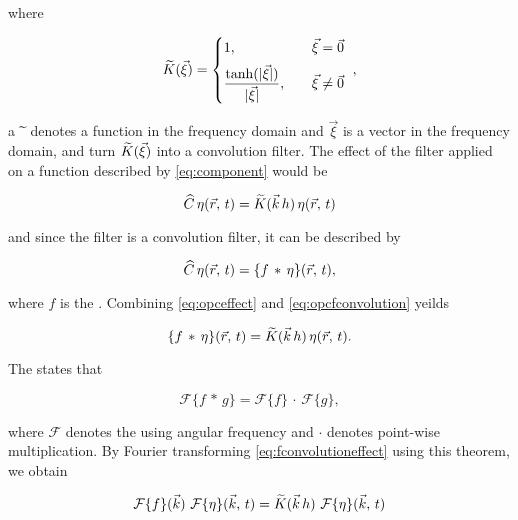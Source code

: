 where

\begin{equation} \label{eq:transkernelofxivec}
\widetilde{K}(\vec{\xi}) = \begin{cases}
1                                                  , & \quad \vec{\xi} = \vec{0} \\[.5em]
\displaystyle\frac{\tanh(|\vec{\xi}|)}{|\vec{\xi}|}, & \quad \vec{\xi} \neq \vec{0}
\end{cases}\ ,
\end{equation}

a $\widetilde{~}$ denotes a function in the frequency domain and $\vec{\xi}$ is a  vector in the frequency domain, and turn $\widetilde{K}(\vec{\xi})$ into a convolution filter. The effect of the filter applied on a function described by \eqref{eq:component} would be

\begin{equation} \label{eq:opceffect}
\widehat{C}\,\eta(\vec{r},\,t) = \widetilde{K}(\vec{k}\,h)\,\eta(\vec{r},\,t)
\end{equation}

and since the filter is a convolution filter, it can be described by

\begin{equation} \label{eq:opcfconvolution}
\widehat{C}\,\eta(\vec{r},\,t) = \{f\,*\,\eta\}(\vec{r},\,t),
\end{equation}

where $f$ is the . Combining \eqref{eq:opceffect} and \eqref{eq:opcfconvolution} yeilds

\begin{equation} \label{eq:fconvolutioneffect}
\{f\,*\,\eta\}(\vec{r},\,t) = \widetilde{K}(\vec{k}\,h)\,\eta(\vec{r},\,t).
\end{equation}

The  states that

\begin{equation} \label{eq:convolutiontheorem}
\mathcal{F}\{f\,*\,g\} = \mathcal{F}\{f\}\,\cdot\,\mathcal{F}\{g\},
\end{equation}

where $\mathcal{F}$ denotes the  using angular frequency and $\cdot$ denotes point-wise multiplication. By Fourier transforming \eqref{eq:fconvolutioneffect} using this theorem, we obtain

\begin{equation}
\mathcal{F}\{f\}(\vec{k})\ \mathcal{F}\{\eta\}(\vec{k},\,t) = \fdfunc{K}(\vec{k}\,h)\ \mathcal{F}\{\eta\}(\vec{k},\,t)
\end{equation}

